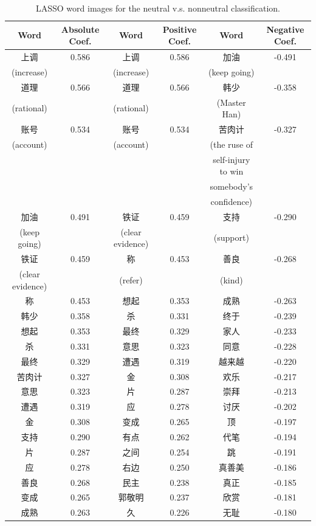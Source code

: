 \documentclass[11pt]{article}
\newcommand{\1}[1]{{\mathbf 1}\left\{#1\right\}}        %
\begin{document}
\begin{table}[!h]
\caption{LASSO word images for the neutral v.s. nonneutral classification.}
\begin{center}
\begin{tabular}{|c|c||c|c||c|c|}
\hline
Word & Absolute Coef. & Word & Positive Coef. & Word & Negative Coef.\\ \hline
上调 & 0.586 & 上调 & 0.586 & 加油 & -0.491\\
(increase) & & (increase) & & (keep going) & \\\hline
道理 & 0.566 & 道理 & 0.566 & 韩少 & -0.358\\
(rational) & & (rational) & & (Master Han) & \\\hline
账号 & 0.534 & 账号 & 0.534 & 苦肉计 & -0.327\\
(account) & & (account) & & (the ruse of  & \\
& &  & &  self-injury to win & \\
& &  & &  somebody's & \\
& &  & &   confidence) & \\\hline
加油 & 0.491 & 铁证 & 0.459 & 支持 & -0.290\\
(keep going) & & (clear evidence) & & (support) & \\\hline
铁证 & 0.459 & 称 & 0.453 & 善良 & -0.268\\
(clear evidence) & & (refer) & & (kind) & \\\hline
称 & 0.453 & 想起 & 0.353 & 成熟 & -0.263\\ \hline
韩少 & 0.358 & 杀 & 0.331 & 终于 & -0.239\\ \hline
想起 & 0.353 & 最终 & 0.329 & 家人 & -0.233\\ \hline
杀 & 0.331 & 意思 & 0.323 & 同意 & -0.228\\ \hline
最终 & 0.329 & 遭遇 & 0.319 & 越来越 & -0.220\\ \hline
苦肉计 & 0.327 & 金 & 0.308 & 欢乐 & -0.217\\ \hline
意思 & 0.323 & 片 & 0.287 & 崇拜 & -0.213\\ \hline
遭遇 & 0.319 & 应 & 0.278 & 讨厌 & -0.202\\ \hline
金 & 0.308 & 变成 & 0.265 & 顶 & -0.197\\ \hline
支持 & 0.290 & 有点 & 0.262 & 代笔 & -0.194\\ \hline
片 & 0.287 & 之间 & 0.254 & 跳 & -0.191\\ \hline
应 & 0.278 & 右边 & 0.250 & 真善美 & -0.186\\ \hline
善良 & 0.268 & 民主 & 0.238 & 真正 & -0.185\\ \hline
变成 & 0.265 & 郭敬明 & 0.237 & 欣赏 & -0.181\\ \hline
成熟 & 0.263 & 久 & 0.226 & 无耻 & -0.180\\ \hline
\end{tabular}
\label{tb:lassofullneu}
\end{center}
\end{table}
\end{document}
